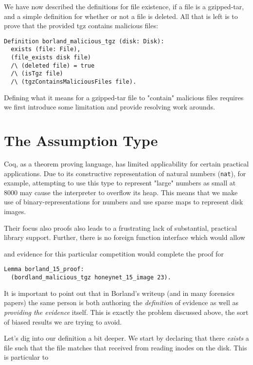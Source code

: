\documentclass[nocopyrightspace]{sigplanconf}
\begin{document}
We have now described the definitions for file existence, if a file is a
gzipped-tar, and a simple definition for whether or not a file is deleted. All
that is left is to prove that the provided tgz contains malicious files:

\begin{lstlisting}
Definition borland_malicious_tgz (disk: Disk):
  exists (file: File),
  (file_exists disk file)
  /\ (deleted file) = true
  /\ (isTgz file)
  /\ (tgzContainsMaliciousFiles file).
\end{lstlisting}

Defining what it means for a gzipped-tar file to "contain" malicious files
requires we first introduce some limitation and provide resolving work
arounds.

\section{The Assumption Type}

Coq, as a theorem proving language, has limited applicability for certain
practical applications. Due to its constructive representation of natural
numbers ({\tt nat}), for example, attempting to use this type to represent
"large" numbers as small at 8000 may cause the interpreter to overflow its
heap. This means that we make use of binary-representations for numbers and
use sparse maps to represent disk images. 

Their focus also proofs also leads to a frustrating lack of substantial,
practical library support. Further, there is no foreign function interface
which would allow 


and evidence for this particular competition would complete the proof for

\begin{lstlisting}
Lemma borland_15_proof: 
  (bordland_malicious_tgz honeynet_15_image 23).
\end{lstlisting}

It is important to point out that in Borland's writeup (and in many forensics
papers) the same person is both authoring the {\it definition} of evidence as
well as {\it providing the evidence} itself. This is exactly the problem
discussed above, the sort of biased results we are trying to avoid.

Let's dig into our definition a bit deeper. We start by declaring that there
{\it exists} a file such that the file matches that received from reading
inodes on the disk. This is particular to 
\end{document}
